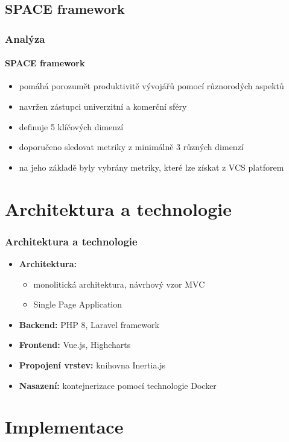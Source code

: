 \documentclass[czech,sage]{ctufit-presentation}
\begin{document}
\subsection{SPACE framework}
\begin{frame}
    \frametitle{Analýza}
    \framesubtitle{SPACE framework}
    \begin{itemize}
        \item pomáhá porozumět produktivitě vývojářů pomocí různorodých aspektů
        \item navržen zástupci univerzitní a komerční sféry
        \item definuje 5 klíčových dimenzí
        \item doporučeno sledovat metriky z minimálně 3 různých dimenzí
        \item na jeho základě byly vybrány metriky, které lze získat z VCS platforem
    \end{itemize}
\end{frame}

\section{Architektura a technologie}
\begin{frame}
    \frametitle{Architektura a technologie}
    \begin{itemize}
        \item \textbf{Architektura:}
        \begin{itemize}
            \item monolitická architektura, návrhový vzor MVC
            \item Single Page Application
        \end{itemize}
        \item \textbf{Backend:} PHP 8, Laravel framework
        \item \textbf{Frontend:} Vue.js, Highcharts
        \item \textbf{Propojení vrstev:} knihovna Inertia.js
        \item \textbf{Nasazení:} kontejnerizace pomocí technologie Docker
    \end{itemize}
\end{frame}

\section{Implementace}
\end{document}
